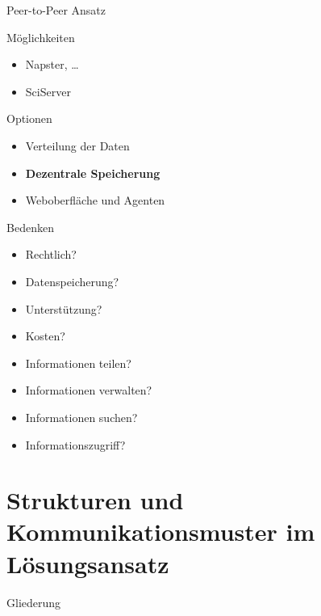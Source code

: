 \documentclass{beamer}
\begin{document}
\begin{frame}[shrink]{Peer-to-Peer Ansatz}
	
	\begin{block}{Möglichkeiten}
		\begin{itemize}
			\item Napster, \ldots
			\item SciServer
		\end{itemize}
		
	\end{block}
	
	\begin{block}{Optionen}
		\begin{itemize}
			\item Verteilung der Daten
			\item \textbf{Dezentrale Speicherung}
			\item Weboberfläche und Agenten
		\end{itemize}
		
		
	\end{block}
	
	
	\begin{block}{Bedenken}
		\begin{multicols}{2}
			\begin{itemize}
				\item Rechtlich? 
				\item Datenspeicherung?
				\item Unterstützung?
				\item Kosten?
				\item Informationen teilen?
				\item Informationen verwalten?
				\item Informationen suchen?
				\item Informationszugriff?
			\end{itemize}		
		\end{multicols}
	\end{block}
	
	
	\bigskip
	
\end{frame}



\section{Strukturen und Kommunikationsmuster im Lösungsansatz}

\begin{frame}[shrink]{Gliederung}
\end{frame}
\end{document}

